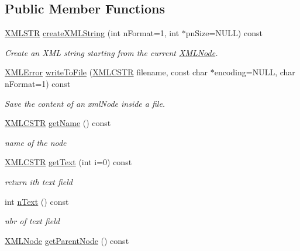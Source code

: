 \subsection*{Public Member Functions}
\begin{DoxyCompactItemize}
\item 
\hyperlink{xmlParser_8h_a849d96105aa0c8f64b5c10d9151a3cdc}{X\-M\-L\-S\-T\-R} \hyperlink{group__conversions_gac8710ba5e7ff6e62a222445501ef9972}{create\-X\-M\-L\-String} (int n\-Format=1, int $\ast$pn\-Size=N\-U\-L\-L) const 
\begin{DoxyCompactList}\small\item\em Create an X\-M\-L string starting from the current \hyperlink{structXMLNode}{X\-M\-L\-Node}. \end{DoxyCompactList}\item 
\hyperlink{xmlParser_8h_ac39bd07b1461aaa70afffe2d7162b4f5}{X\-M\-L\-Error} \hyperlink{group__conversions_gab8d92d057c0072cc195b1935b2f53d80}{write\-To\-File} (\hyperlink{xmlParser_8h_acdb0d6fd8dd596384b438d86cfb2b182}{X\-M\-L\-C\-S\-T\-R} filename, const char $\ast$encoding=N\-U\-L\-L, char n\-Format=1) const 
\begin{DoxyCompactList}\small\item\em Save the content of an xml\-Node inside a file. \end{DoxyCompactList}\item 
\hyperlink{xmlParser_8h_acdb0d6fd8dd596384b438d86cfb2b182}{X\-M\-L\-C\-S\-T\-R} \hyperlink{group__navigate_ga7e07715aa0ed894da96bd66c90d423f0}{get\-Name} () const 
\begin{DoxyCompactList}\small\item\em name of the node \end{DoxyCompactList}\item 
\hyperlink{xmlParser_8h_acdb0d6fd8dd596384b438d86cfb2b182}{X\-M\-L\-C\-S\-T\-R} \hyperlink{group__navigate_gaeb607292b18d4615b7c169c7c08c0a8b}{get\-Text} (int i=0) const 
\begin{DoxyCompactList}\small\item\em return ith text field \end{DoxyCompactList}\item 
int \hyperlink{group__navigate_ga22e7e7cf8f173a1ec3ec3d6ff60819d9}{n\-Text} () const 
\begin{DoxyCompactList}\small\item\em nbr of text field \end{DoxyCompactList}\item 
\hyperlink{structXMLNode}{X\-M\-L\-Node} \hyperlink{group__navigate_gad30a8420556e220742c681e353a875d8}{get\-Parent\-Node} () const 

\end{DoxyCompactItemize}
